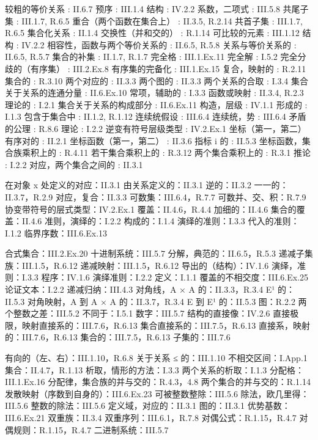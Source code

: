 较粗的等价关系 : II.6.7 预序 : III.1.4 结构 : IV.2.2 系数，二项式 : III.5.8 共尾子集 : III.1.7, R.6.5 重合（两个函数在集合上） : II.3.5, R.2.14 共首子集 : III.1.7, R.6.5 集合化关系 : II.1.4 交换性（并和交的） : R.1.14 可比较的元素 : III.1.12 结构 : IV.2.2 相容性，函数与两个等价关系的 : II.6.5, R.5.8 关系与等价关系的 : II.6.5, R.5.7 集合的补集 : II.1.7, R.1.7 完全格 : III.1.Ex.11 完全解 : I.5.2 完全分歧的（有序集） : III.2.Ex.8 有序集的完备化 : III.1.Ex.15 复合，映射的 : R.2.11 集合的 : R.3.10 两个对应的 : II.3.3 两个图的 : II.3.3 两个关系的合取 : I.3.4 集合关于关系的连通分量 : II.6.Ex.10 常项，辅助的 : I.3.3 函数或映射 : II.3.4, R.2.3 理论的 : I.2.1 集合关于关系的构成部分 : II.6.Ex.11 构造，层级 : IV.1.1 形成的 : I.1.3 包含于集合中 : II.1.2, R.1.12 连续统假设 : III.6.4 连续统，势 : III.6.4 矛盾的公理 : R.8.6 理论 : I.2.2 逆变有符号层级类型 : IV.2.Ex.1 坐标（第一，第二）有序对的 : II.2.1 坐标函数（第一，第二） : II.3.6 指标 i 的 : II.5.3 坐标函数，集合族乘积上的 : R.4.11 若干集合乘积上的 : R.3.12 两个集合乘积上的 : R.3.1 推论 : I.2.2 对应，两个集合之间的 : II.3.1

在对象 x 处定义的对应：II.3.1 由关系定义的：II.3.1 逆的：II.3.2 一一的：II.3.7，R.2.9 对应，复合：II.3.3 可数集：III.6.4，R.7.7 可数并、交、积：R.7.9 协变带符号的层式类型：IV.2.Ex.1 覆盖：II.4.6，R.4.4 加细的：II.4.6 集合的覆盖：II.4.6 准则，演绎的：I.2.2 构成的：I.1.4 演绎的准则：I.3.3 代入的准则：I.1.2 临界序数：III.6.Ex.13

合式集合：III.2.Ex.20 十进制系统：III.5.7 分解，典范的：II.6.5，R.5.3 递减子集族：III.1.5，R.6.12 递减映射：III.1.5，R.6.12 导出的（结构）：IV.1.6 演绎，准则：I.3.3 程序：IV.1.6 演绎准则：I.2.2 定义：I.1.1 覆盖的不相交度：III.6.Ex.25 论证文本：I.2.2 递减归纳：III.4.3 对角线，A × A 的：II.3.3，R.3.4 E¹ 的：II.5.3 对角映射，A 到 A × A 的：II.3.7，R.3.4 E 到 E¹ 的：II.5.3 图：R.2.2 两个整数之差：III.5.2 不同于：I.5.1 数字：III.5.7 结构的直接像：IV.2.6 直接极限，映射直接系的：III.7.6，R.6.13 集合直接系的：III.7.5，R.6.13 直接系，映射的：III.7.6，R.6.13 集合的：III.7.5，R.6.13 子集的：III.7.6

有向的（左、右）：III.1.10，R.6.8 关于关系 ≤ 的：III.1.10 不相交区间：I.App.1 集合：II.4.7，R.1.13 析取，情形的方法：I.3.3 两个关系的析取：I.1.3 分配格：III.1.Ex.16 分配律，集合族的并与交的：R.4.3，4.8 两个集合的并与交的：R.1.14 发散映射（序数到自身的）：III.6.Ex.23 可被整数整除：III.5.6 除法，欧几里得：III.5.6 整数的除法：III.5.6 定义域，对应的：II.3.1 图的：II.3.1 优势基数：III.6.Ex.21 双重族：II.3.4 双重序列：III.6.1，R.7.8 对偶公式：R.1.15，R.4.7 对偶规则：R.1.15，R.4.7 二进制系统：III.5.7

